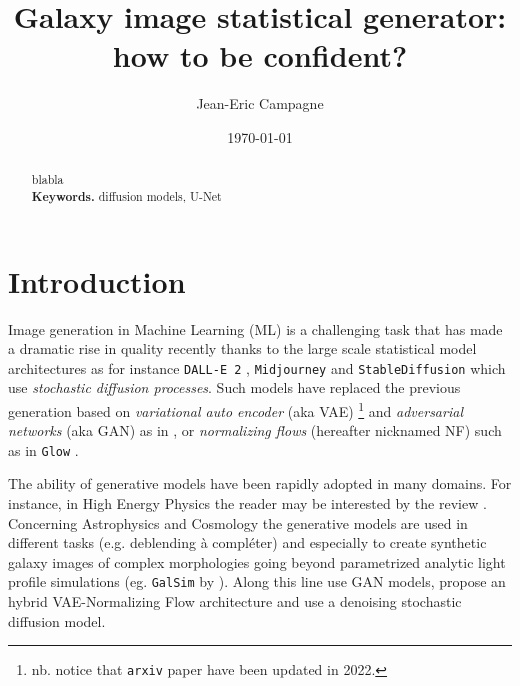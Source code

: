 \documentclass[11pt]{amsart}
\title{Galaxy image statistical generator: how to be confident?}
\author{Jean-Eric Campagne}
\date{\today}
\begin{document}
\maketitle
%
\begin{abstract}
blabla
\\
\smallskip
\noindent \textbf{Keywords.} diffusion models, U-Net
\end{abstract}

\section{Introduction}
\label{sec:Intro}
Image generation in Machine Learning (ML) is a challenging task that has made a dramatic rise in quality recently thanks to the large scale statistical model architectures as for instance \texttt{DALL-E 2} \citep{ramesh2022}, \texttt{Midjourney} \citep{Oppenlaender2022} and \texttt{StableDiffusion} \citep{Rombach2022} which use \textit{stochastic diffusion processes}. Such models have replaced the previous generation based on \textit{variational auto encoder} (aka VAE) \citep{Kingma2014}\footnote{nb. notice that \texttt{arxiv} paper have been updated in 2022.} and  \textit{adversarial networks} (aka GAN) \citep{goodfellow2014generative} as in \citep[e.g.]{KarrasALL18,brock2018large}, or \textit{normalizing flows} (hereafter nicknamed NF) such as in \texttt{Glow} \citep{Kingma2018}. 


The ability of generative models have been rapidly adopted in many domains. For instance, in High Energy Physics the reader may be interested by the review \cite{PhysRevD.107.076017}. Concerning Astrophysics and Cosmology the generative models are used in different tasks (e.g. deblending \citep{Hemmati_2022,Arcelin2020} {\color{red} à compléter}) and especially to create synthetic galaxy images of complex morphologies going beyond parametrized analytic light profile simulations (eg. \texttt{GalSim} by \cite{ROWE2015121}). Along this line \citep{ravanbakhsh2016,Fussell2019} use GAN models, \cite{Lanusse2021} propose an hybrid VAE-Normalizing Flow architecture and \cite{smith2021} use a denoising stochastic diffusion model. 
\end{document}

